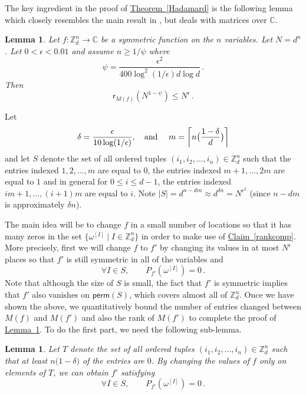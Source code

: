 \documentclass[11pt]{article}
\numberwithin{equation}{section}
\newtheorem{lemma}[theorem]{Lemma}
\theoremstyle{definition}
\theoremstyle{plain}
\newcommand{\C}{\mathbb C}
\newcommand{\Z}{\mathbb Z}
\newcommand{\expref}[2]{\hyperref[#2]{#1~\ref{#2}}}
\theoremstyle{definition}
\renewcommand\Z{{\mathbb{Z}}}
\renewcommand\C{{\mathbb{C}}}
\newcommand\perm{\textsf{perm}}
\begin{document}
The key ingredient in the proof of \expref{Theorem}{Hadamard} is the following lemma which closely resembles the main result in \cite{CLP}, but deals with matrices over $\C$.
\begin{lemma}\label{non-rigidity1}
Let $f: \Z_d^n \rightarrow \C$ be a symmetric function on the $n$ variables.  Let $N = d^n$.  Let $0 < \epsilon < 0.01 $ and assume $n \geq 1/\psi$ where \[\psi = \frac{\epsilon^2 }{400\log^2 (1/\epsilon) d \log d} \,. \]  Then 
\[
\textsf{r}_{M(f)}\left(N^{1 - \psi}\right) \leq N^{ \epsilon} \,.
\]

\end{lemma}
%
%
Let %
\[
\delta = \frac{\epsilon}{10\log (1/\epsilon)},
   \text{\quad and \quad}
m = \left\lceil n\big( \frac{1 - \delta}{d} \big) \right\rceil
\]
and let $S$ denote the set of all ordered tuples $(i_1, i_2, \dots ,i_n) \in \Z_d^n$ such that the entries indexed
$1,2, \dots ,m$   %
are equal to $0$, the entries indexed $m+1, \dots ,2m$ are equal to $1$ and in general for $0 \leq i \leq d-1$, the entries indexed $im + 1, \dots , (i+1)m$ are equal to $i$.  Note $|S| = d^{n-dm} \approx d^{\delta n} = N^{\epsilon^2}$ (since $n - dm$ is approximately $\delta n$).  

The main idea will be to change $f$ in a small number of locations so that it has many zeros in the set %
$\{\omega^{[I]} \mid I \in \Z_d^n \}$ %
in order to make use of \expref{Claim}{rankcomp}.  More precisely, first we will change $f$ to $f'$ by changing its values in at most $N^{\epsilon}$ places so that $f'$ is still symmetric in all of the variables and
%
%
\begin{equation*} \forall I\in S,\qquad P_{f'}\left( \omega^{[I]} \right) = 0 \,.
\end{equation*}   %
Note that although the size of $S$ is small, the fact that $f'$ is symmetric implies that $f'$ also vanishes on $\perm(S)$, which covers almost all of $\Z_d^n$.  Once we have shown the above, we quantitatively bound the number of entries changed between $M(f)$ and $M(f')$ and also the rank of $M(f')$ to complete the proof of \expref{Lemma}{non-rigidity1}.  To do the first part, we need the following sub-lemma.
\begin{lemma}\label{changes}
Let $T$ denote the set of all ordered tuples $(i_1, i_2, \dots ,i_n) \in \Z_d^n$  such that at least $n\big(1 - \delta \big)$ of the entries are $0$. By changing the values of $f$ only on elements of $T$, we can obtain $f'$ satisfying 
%
\begin{equation}\label{roots} \forall I\in S, \qquad
P_{f'}\left( \omega^{[I]} \right) = 0 \,.
\end{equation}
\end{lemma}
\end{document}
